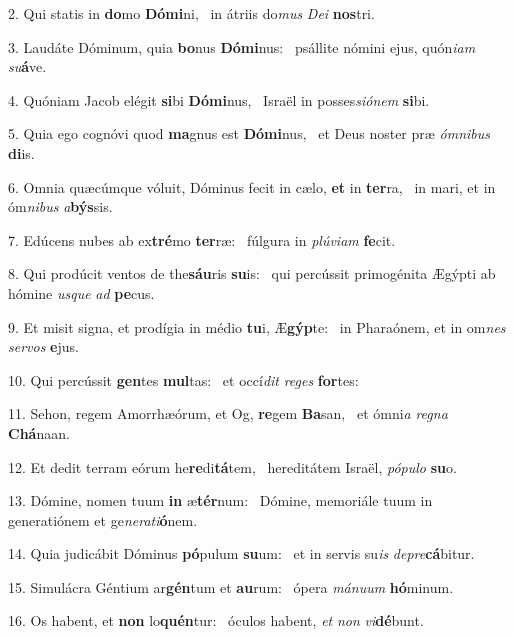 2. Qui statis in \textbf{do}mo \textbf{Dó}\textbf{mi}ni, \ast\  in átriis do\textit{mus} \textit{De}\textit{i} \textbf{nos}tri.\

3. Laudáte Dóminum, quia \textbf{bo}nus \textbf{Dó}\textbf{mi}nus: \ast\  psállite nómini ejus, quón\textit{i}\textit{am} \textit{su}\textbf{á}ve.\

4. Quóniam Jacob elégit \textbf{si}bi \textbf{Dó}\textbf{mi}nus, \ast\  Israël in posses\textit{si}\textit{ó}\textit{nem} \textbf{si}bi.\

5. Quia ego cognóvi quod \textbf{ma}gnus est \textbf{Dó}\textbf{mi}nus, \ast\  et Deus noster præ \textit{óm}\textit{ni}\textit{bus} \textbf{di}is.\

6. Omnia quæcúmque vóluit, Dóminus fecit in cælo, \textbf{et} in \textbf{ter}ra, \ast\  in mari, et in óm\textit{ni}\textit{bus} \textit{a}\textbf{býs}sis.\

7. Edúcens nubes ab ex\textbf{tré}mo \textbf{ter}ræ: \ast\  fúlgura in \textit{plú}\textit{vi}\textit{am} \textbf{fe}cit.\

8. Qui prodúcit ventos de the\textbf{sáu}ris \textbf{su}is: \ast\  qui percússit primogénita Ægýpti ab hómine \textit{us}\textit{que} \textit{ad} \textbf{pe}cus.\

9. Et misit signa, et prodígia in médio \textbf{tu}i, Æ\textbf{gýp}te: \ast\  in Pharaónem, et in om\textit{nes} \textit{ser}\textit{vos} \textbf{e}jus.\

10. Qui percússit \textbf{gen}tes \textbf{mul}tas: \ast\  et occí\textit{dit} \textit{re}\textit{ges} \textbf{for}tes:\

11. Sehon, regem Amorrhæórum, et Og, \textbf{re}gem \textbf{Ba}san, \ast\  et ómni\textit{a} \textit{re}\textit{gna} \textbf{Chá}naan.\

12. Et dedit terram eórum he\textbf{re}di\textbf{tá}tem, \ast\  hereditátem Israël, \textit{pó}\textit{pu}\textit{lo} \textbf{su}o.\

13. Dómine, nomen tuum \textbf{in} æ\textbf{tér}num: \ast\  Dómine, memoriále tuum in generatiónem et ge\textit{ne}\textit{ra}\textit{ti}\textbf{ó}nem.\

14. Quia judicábit Dóminus \textbf{pó}pulum \textbf{su}um: \ast\  et in servis su\textit{is} \textit{de}\textit{pre}\textbf{cá}bitur.\

15. Simulácra Géntium ar\textbf{gén}tum et \textbf{au}rum: \ast\  ópera \textit{má}\textit{nu}\textit{um} \textbf{hó}minum.\

16. Os habent, et \textbf{non} lo\textbf{quén}tur: \ast\  óculos habent, \textit{et} \textit{non} \textit{vi}\textbf{dé}bunt.\

